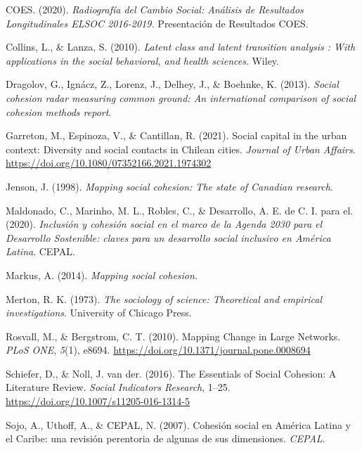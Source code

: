\documentclass[
  12pt,
]{book}
\begin{document}
\leavevmode\hypertarget{ref-coes_radiografia_2020}{}%
COES. (2020). \emph{Radiografía del Cambio Social: Análisis de Resultados Longitudinales ELSOC 2016-2019.} Presentación de Resultados COES.

\leavevmode\hypertarget{ref-collins_latent_2010}{}%
Collins, L., \& Lanza, S. (2010). \emph{Latent class and latent transition analysis : With applications in the social behavioral, and health sciences}. Wiley.

\leavevmode\hypertarget{ref-dragolov_social_2013}{}%
Dragolov, G., Ignácz, Z., Lorenz, J., Delhey, J., \& Boehnke, K. (2013). \emph{Social cohesion radar measuring common ground: An international comparison of social cohesion methods report}.

\leavevmode\hypertarget{ref-garreton_social_2021}{}%
Garreton, M., Espinoza, V., \& Cantillan, R. (2021). Social capital in the urban context: Diversity and social contacts in Chilean cities. \emph{Journal of Urban Affairs}. \url{https://doi.org/10.1080/07352166.2021.1974302}

\leavevmode\hypertarget{ref-jenson_mapping_1998}{}%
Jenson, J. (1998). \emph{Mapping social cohesion: The state of Canadian research}.

\leavevmode\hypertarget{ref-maldonado_inclusion_2020}{}%
Maldonado, C., Marinho, M. L., Robles, C., \& Desarrollo, A. E. de C. I. para el. (2020). \emph{Inclusión y cohesión social en el marco de la Agenda 2030 para el Desarrollo Sostenible: claves para un desarrollo social inclusivo en América Latina}. CEPAL.

\leavevmode\hypertarget{ref-markus_mapping_2014}{}%
Markus, A. (2014). \emph{Mapping social cohesion}.

\leavevmode\hypertarget{ref-merton_sociology_1973}{}%
Merton, R. K. (1973). \emph{The sociology of science: Theoretical and empirical investigations}. University of Chicago Press.

\leavevmode\hypertarget{ref-rosvall_mapping_2010}{}%
Rosvall, M., \& Bergstrom, C. T. (2010). Mapping Change in Large Networks. \emph{PLoS ONE}, \emph{5}(1), e8694. \url{https://doi.org/10.1371/journal.pone.0008694}

\leavevmode\hypertarget{ref-schiefer_essentials_2016}{}%
Schiefer, D., \& Noll, J. van der. (2016). The Essentials of Social Cohesion: A Literature Review. \emph{Social Indicators Research}, 1--25. \url{https://doi.org/10.1007/s11205-016-1314-5}

\leavevmode\hypertarget{ref-sojo_cohesion_2007}{}%
Sojo, A., Uthoff, A., \& CEPAL, N. (2007). Cohesión social en América Latina y el Caribe: una revisión perentoria de algunas de sus dimensiones. \emph{CEPAL}.
\end{document}
